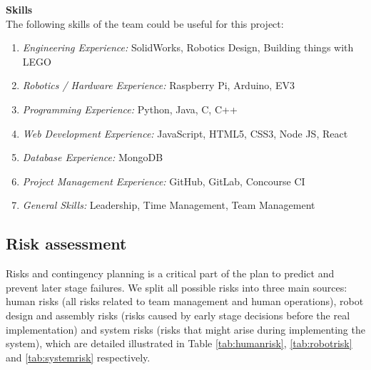 \documentclass{article}
\begin{document}
\newpage

\textbf{Skills} \\
The following skills of the team could be useful for this project: \\

\vspace{-25mm}

\begin{enumerate}
    \vspace{-8mm}
    \setlength{\itemsep}{0pt}%
    \setlength{\parskip}{0pt}
    \item \textit{Engineering Experience: }SolidWorks, Robotics Design, Building things with LEGO 
    \item \textit{Robotics / Hardware Experience: }Raspberry Pi, Arduino, EV3 
    \item \textit{Programming Experience: }Python, Java, C, C++ 
    \item \textit{Web Development Experience: }JavaScript, HTML5, CSS3, Node JS, React
    \item \textit{Database Experience: } MongoDB
    \item \textit{Project Management Experience: }GitHub, GitLab, Concourse CI
    \item \textit{General Skills: }Leadership, Time Management, Team Management
\end{enumerate}
\vspace{-8mm}
\subsection{Risk assessment} 
Risks and contingency planning is a critical part of the plan to predict and prevent later stage failures. We split all possible risks into three main sources: human risks (all risks related to team management and human operations), robot design and assembly risks (risks caused by early stage decisions before the real implementation) and system risks (risks that might arise during implementing the system), which are detailed illustrated in Table \ref{tab:humanrisk}, \ref{tab:robotrisk} and \ref{tab:systemrisk} respectively.
\vspace{-15mm}





\vspace{15mm}











\clearpage

\end{document}
